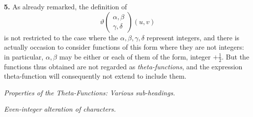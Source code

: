 \documentclass[11pt]{article}
\begin{document}
\textbf{5.} As already remarked, the definition of
\[
\vartheta\!\begin{pmatrix} \alpha,\beta \\ \gamma,\delta \end{pmatrix}\!(u,v)
\]
is not restricted to the case where the $\alpha,\beta,\gamma,\delta$ represent integers, and there is actually occasion to consider functions of this form where they are not integers: in particular, $\alpha,\beta$ may be either or each of them of the form, integer $+ \tfrac{1}{2}$. But the functions thus obtained are not regarded as \textit{theta-functions}, and the expression theta-function will consequently not extend to include them.

\medskip

\textit{Properties of the Theta-Functions: Various sub-headings.}

\medskip

\textit{Even-integer alteration of characters.}

\medskip
\end{document}
